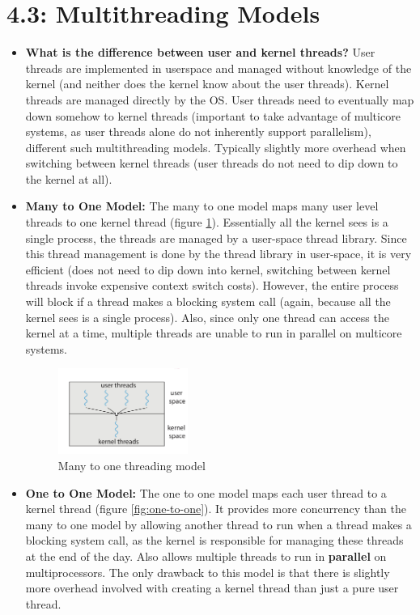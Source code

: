 \documentclass[12pt]{article}
\begin{document}
\section*{4.3: Multithreading Models}

\begin{itemize}
    \item \textbf{What is the difference between user and kernel threads?} User threads are implemented in userspace and managed without knowledge of the kernel (and neither does the kernel know about the user threads). Kernel threads are managed directly by the OS. User threads need to eventually map down somehow to kernel threads (important to take advantage of multicore systems, as user threads alone do not inherently support parallelism), different such multithreading models. Typically slightly more overhead when switching between kernel threads (user threads do not need to dip down to the kernel at all).
    \item \textbf{Many to One Model:} The many to one model maps many user level threads to one kernel thread (figure \ref{fig:many-to-one}). Essentially all the kernel sees is a single process, the threads are managed by a user-space thread library. Since this thread management is done by the thread library in user-space, it is very efficient (does not need to dip down into kernel, switching between kernel threads invoke expensive context switch costs). However, the entire process will block if a thread makes a blocking system call (again, because all the kernel sees is a single process). Also, since only one thread can access the kernel at a time, multiple threads are unable to run in parallel on multicore systems.
        \begin{figure}[ht]
            \centering
            \includegraphics[width=0.4\textwidth]{figures/many-to-one.jpg}
            \caption{Many to one threading model}
            \label{fig:many-to-one}
        \end{figure}
    \item \textbf{One to One Model:} The one to one model maps each user thread to a kernel thread (figure \ref{fig:one-to-one}). It provides more concurrency than the many to one model by allowing another thread to run when a thread makes a blocking system call, as the kernel is responsible for managing these threads at the end of the day. Also allows multiple threads to run in \textbf{parallel} on multiprocessors. The only drawback to this model is that there is slightly more overhead involved with creating a kernel thread than just a pure user thread.

\end{itemize}
\end{document}
